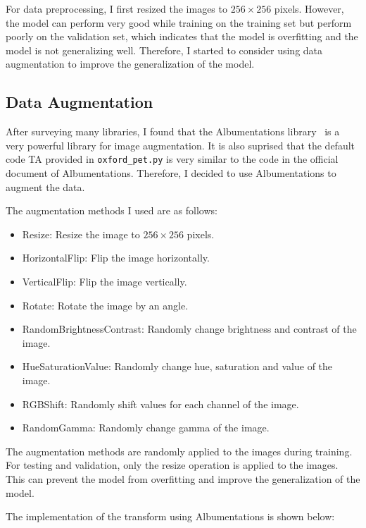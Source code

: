 
For data preprocessing, I first resized the images to $256 \times 256$ pixels.
However, the model can perform very good while training on the training set but perform poorly on the validation set, which indicates that the model is overfitting and the model is not generalizing well.
Therefore, I started to consider using data augmentation to improve the generalization of the model.

\subsection{Data Augmentation}

After surveying many libraries, I found that the Albumentations library~\cite{Albumentations} is a very powerful library for image augmentation.
It is also suprised that the default code TA provided in \texttt{oxford\_pet.py} is very similar to the code in the official document of Albumentations.
Therefore, I decided to use Albumentations to augment the data.

The augmentation methods I used are as follows:

\begin{itemize}
    \item Resize: Resize the image to $256 \times 256$ pixels.
    \item HorizontalFlip: Flip the image horizontally.
    \item VerticalFlip: Flip the image vertically.
    \item Rotate: Rotate the image by an angle.
    \item RandomBrightnessContrast: Randomly change brightness and contrast of the image.
    \item HueSaturationValue: Randomly change hue, saturation and value of the image.
    \item RGBShift: Randomly shift values for each channel of the image.
    \item RandomGamma: Randomly change gamma of the image.
\end{itemize}

The augmentation methods are randomly applied to the images during training.
For testing and validation, only the resize operation is applied to the images.
This can prevent the model from overfitting and improve the generalization of the model.

The implementation of the transform using Albumentations is shown below:

\inputminted[firstline=121]{python}{../src/oxford_pet.py}

